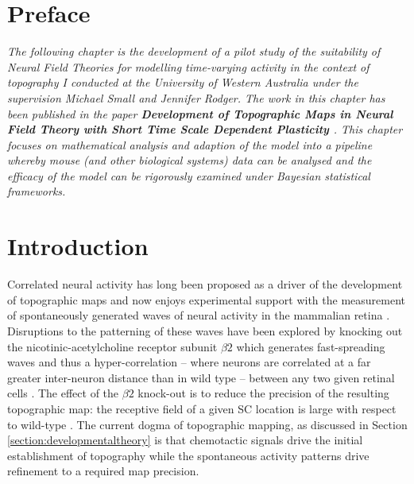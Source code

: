 \section{Preface}
\textit{The following chapter is the development of a pilot study of the suitability of Neural Field Theories for modelling time-varying activity in the context of topography I conducted at the University of Western Australia under the supervision Michael Small and Jennifer Rodger. The work in this chapter has been published in the paper \textbf{Development of Topographic Maps in Neural Field Theory with Short Time Scale Dependent Plasticity \cite{Gale2022-kq}}. This chapter focuses on mathematical analysis and adaption of the model into a pipeline whereby mouse (and other biological systems) data can be analysed and the efficacy of the model can be rigorously examined under Bayesian statistical frameworks.}

\section{Introduction}
Correlated neural activity has long been proposed as a driver of the development of topographic maps and now enjoys experimental support with the measurement of spontaneously generated waves of neural activity in the mammalian retina \cite{Chung1974-oy, Meister1991-mu, Ackman2012-uu, McLaughlin2003-yy, Stafford2009}. Disruptions to the patterning of these waves have been explored by knocking out the nicotinic-acetylcholine receptor subunit $\beta2$ which generates fast-spreading waves and thus a hyper-correlation -- where neurons are correlated at a far greater inter-neuron distance than in wild type -- between any two given retinal cells \cite{Stafford2009}. The effect of the $\beta2$ knock-out is to reduce the precision of the resulting topographic map: the receptive field of a given SC location is large with respect to wild-type \cite{Mrsic-Flogel2005-xp, McLaughlin2003-yy, Chandrasekaran2005-ug}. The current dogma of topographic mapping, as discussed in Section \ref{section:developmentaltheory} is that chemotactic signals drive the initial establishment of topography while the spontaneous activity patterns drive refinement to a required map precision.

